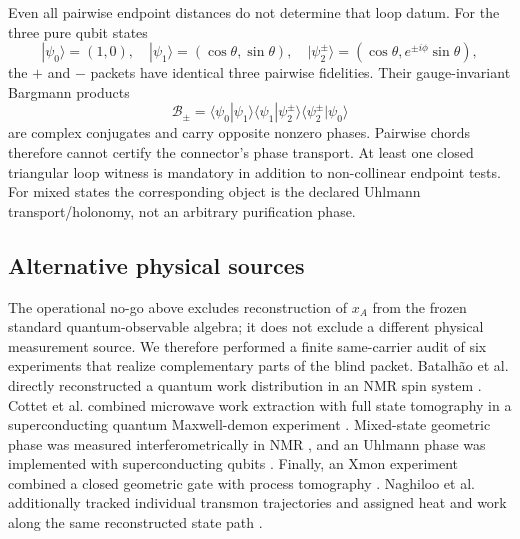Even all pairwise endpoint distances do not determine that loop datum.  For
the three pure qubit states
\begin{equation}
 |\psi_0\rangle=(1,0),\quad
 |\psi_1\rangle=(\cos\theta,\sin\theta),\quad
 |\psi_2^{\pm}\rangle=(\cos\theta,e^{\pm i\phi}\sin\theta),
\end{equation}
the $+$ and $-$ packets have identical three pairwise fidelities.  Their
gauge-invariant Bargmann products
\begin{equation}
 \mathcal B_\pm=
 \langle\psi_0|\psi_1\rangle
 \langle\psi_1|\psi_2^\pm\rangle
 \langle\psi_2^\pm|\psi_0\rangle
\end{equation}
are complex conjugates and carry opposite nonzero phases.  Pairwise chords
therefore cannot certify the connector's phase transport.  At least one
closed triangular loop witness is mandatory in addition to non-collinear
endpoint tests.  For mixed states the corresponding object is the declared
Uhlmann transport/holonomy, not an arbitrary purification phase.

\subsection{Alternative physical sources}

The operational no-go above excludes reconstruction of $x_A$ from the frozen
standard quantum-observable algebra; it does not exclude a different physical
measurement source. We therefore performed a finite same-carrier audit of
six experiments that realize complementary parts of the blind packet.
Batalh\~ao et al. directly reconstructed a quantum work distribution in an
NMR spin system \citep{Batalhao2014Work}. Cottet et al. combined microwave
work extraction with full state tomography in a superconducting quantum
Maxwell-demon experiment \citep{Cottet2017Demon}. Mixed-state geometric phase
was measured interferometrically in NMR \citep{Ghosh2006MixedPhase}, and an
Uhlmann phase was implemented with superconducting qubits
\citep{Viyuela2018Uhlmann}. Finally, an Xmon experiment combined a closed
geometric gate with process tomography \citep{Zhao2020GeometricGate}.
Naghiloo et al. additionally tracked individual transmon trajectories and
assigned heat and work along the same reconstructed state path
\citep{Naghiloo2020Trajectories}.

